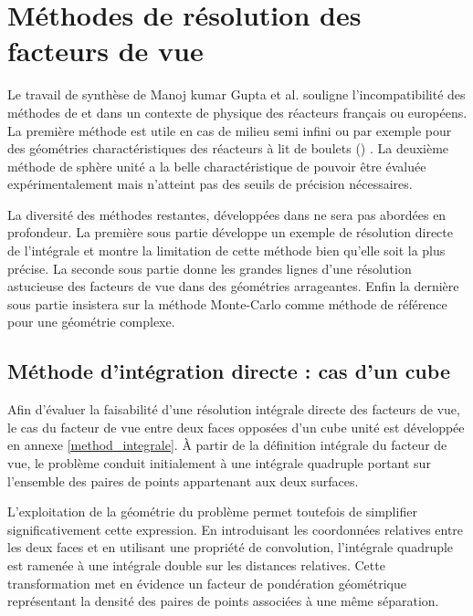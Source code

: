 \section{Méthodes de résolution des facteurs de vue}

Le travail de synthèse de Manoj kumar Gupta et al. \cite{methods_fv} souligne l'incompatibilité des méthodes de  et  \cite{Howell185} dans un contexte de physique des réacteurs français ou européens. La première méthode est utile en cas de milieu semi infini \cite{methods_spinger} ou par exemple pour des géométries charactéristiques des réacteurs à lit de boulets () \cite{pbr9}. La deuxième méthode de sphère unité a la belle charactéristique de pouvoir être évaluée expérimentalement mais n'atteint pas des seuils de précision nécessaires. 

La diversité des méthodes restantes, développées dans \cite{Howell} ne sera pas abordées en profondeur. La première sous partie développe un exemple de résolution directe de l'intégrale et montre la limitation de cette méthode bien qu'elle soit la plus précise. La seconde sous partie donne les grandes lignes d'une résolution astucieuse des facteurs de vue dans des géométries arrageantes. Enfin la dernière sous partie insistera sur la méthode Monte-Carlo comme méthode de référence pour une géométrie complexe. 

\subsection{Méthode d'intégration directe : cas d'un cube}
Afin d'évaluer la faisabilité d'une résolution intégrale directe des facteurs de vue, le cas du facteur de vue entre deux faces opposées d'un cube unité est développée en annexe \ref{method_integrale}. À partir de la définition intégrale du facteur de vue, le problème conduit initialement à une intégrale quadruple portant sur l'ensemble des paires de points appartenant aux deux surfaces.

L'exploitation de la géométrie du problème permet toutefois de simplifier significativement cette expression. En introduisant les coordonnées relatives entre les deux faces et en utilisant une propriété de convolution, l'intégrale quadruple est ramenée à une intégrale double sur les distances relatives. Cette transformation met en évidence un facteur de pondération géométrique représentant la densité des paires de points associées à une même séparation.

